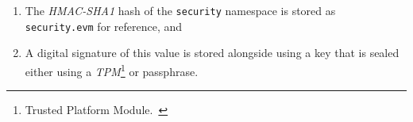 \begin{enumerate}
    \item The \textit{HMAC-SHA1} hash of the \texttt{security} namespace is stored as \texttt{security.evm} for reference, and
    \item A digital signature of this value is stored alongside using a key that is sealed either using a \textit{TPM}\footnote{Trusted Platform Module.~\cite{tpm}} or passphrase.
\end{enumerate}